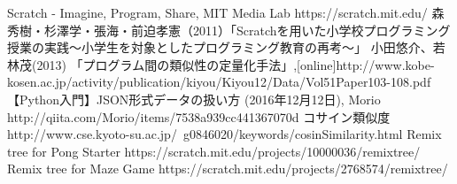\documentclass[twocolumn,9pt,a4paper]{jsarticle}
\begin{document}
\begin{thebibliography}{7}
Scratch - Imagine, Program, Share, MIT Media Lab https://scratch.mit.edu/
森秀樹・杉澤学・張海・前迫孝憲（2011）「Scratchを用いた小学校プログラミング授業の実践〜小学生を対象としたプログラミング教育の再考〜」
小田悠介、若林茂(2013) 「プログラム間の類似性の定量化手法」,[online]http://www.kobe-kosen.ac.jp/activity/publication/kiyou/Kiyou12/Data/Vol51Paper103-108.pdf
【Python入門】JSON形式データの扱い方 (2016年12月12日), Morio http://qiita.com/Morio/items/7538a939cc441367070d
 コサイン類似度 http://www.cse.kyoto-su.ac.jp/~g0846020/keywords/cosinSimilarity.html
Remix tree for Pong Starter https://scratch.mit.edu/projects/10000036/remixtree/
Remix tree for Maze Game https://scratch.mit.edu/projects/2768574/remixtree/

\end{thebibliography}

%
%
\end{document}
